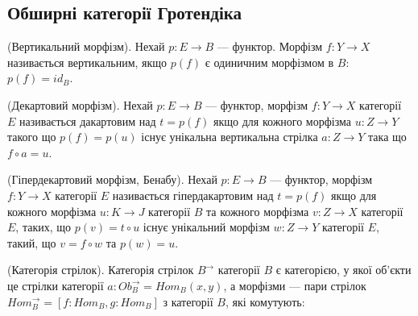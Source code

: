 \newpage
\subsection{Обширні категорії Гротендіка}

\begin{definition} (Вертикальний морфізм).
Нехай $p: E \rightarrow B$ --- функтор. Морфізм $f : Y \rightarrow X$ називається
вертикальним, якщо $p(f)$ є одиничним морфізмом в $B$: $p(f)=id_B$.
\end{definition}

\begin{definition} (Декартовий морфізм).
Нехай $p : E \rightarrow B$ --- функтор,
морфізм $f : Y \rightarrow X$ категорії $E$
називається дакартовим над $t=p(f)$ якщо
для кожного морфізма $u : Z \rightarrow Y$ такого що $p(f)=p(u)$
існує унікальна вертикальна стрілка $a : Z \rightarrow Y$ така що $f\circ a = u$.
\end{definition}

\begin{definition} (Гіпердекартовий морфізм, Бенабу).
Нехай $p : E \rightarrow B$ --- функтор,
морфізм $f : Y \rightarrow X$ категорії $E$
називається гіпердакартовим над $t=p(f)$ якщо
для кожного морфізма $u : K \rightarrow J$ категорії $B$
та кожного морфізма $v : Z \rightarrow X$ категорії $E$,
таких, що $p(v)=t\circ u$ існує унікальний морфізм $w : Z \rightarrow Y$ категорії $E$,
такий, що $v=f\circ w$ та $p(w)=u$.
\end{definition}

\begin{definition} (Категорія стрілок). Категорія стрілок $B^\rightarrow$ категорії $B$ є категорією,
у якої об'єкти це стрілки категорії $a : Ob_B^\rightarrow = Hom_B(x,y)$, а морфізми --- пари
стрілок $Hom_B^\rightarrow = [f : Hom_B, g : Hom_B]$ з категорії $B$, які комутують:
\begin{center}
\end{center}
\end{definition}

